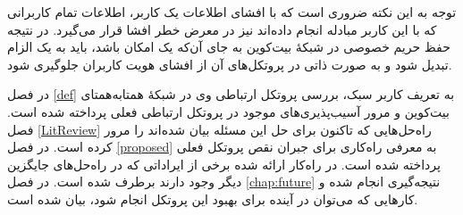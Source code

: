 توجه به این نکته ضروری است که با افشای اطلاعات یک کاربر، اطلاعات تمام کاربرانی که با این کاربر مبادله انجام داده‌اند نیز در معرض خطر افشا قرار می‌گیرد. در نتیجه حفظ حریم خصوصی در شبکه‌ٔ بیت‌کوین به جای آن‌که یک امکان باشد،‌ باید به یک الزام تبدیل شود و به صورت ذاتی در پروتکل‌های آن از افشای هویت کاربران جلوگیری شود.

در فصل \ref{def} به تعریف کاربر سبک، بررسی پروتکل ارتباطی وی در شبکهٔ همتا‌به‌همتای بیت‌کوین و مرور آسیب‌پذیری‌های موجود در پروتکل ارتباطی فعلی پرداخته شده است. فصل \ref{LitReview} راه‌حل‌هایی که تاکنون برای حل این مسئله بیان شده‌اند را مرور کرده است. در فصل \ref{proposed} به معرفی راه‌کاری برای جبران نقص پروتکل فعلی پرداخته شده است. در راه‌کار ارائه شده برخی از ایراداتی که در راه‌حل‌های جایگزین دیگر وجود دارند برطرف شده است. در فصل \ref{chap:future} نتیجه‌گیری انجام شده و کارهایی که می‌توان در آینده برای بهبود این پروتکل انجام شود، بیان شده است.


 



